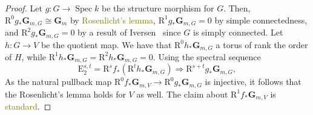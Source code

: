\documentclass[10pt,letterpaper,twoside]{article}
\newcommand{\BA}[1]{\textcolor{olive}{#1}}
\newcommand{\E}{\mathrm{E}}
\newcommand{\R}{\mathrm{R}}
\renewcommand{\1}{\mathbf{1}}
\newcommand{\bG}{\mathbf{G}}
\newcommand{\Gm}{\bG_{m}}
\DeclareMathOperator{\Spec}{Spec}
\newcommand{\iso}{\cong}
\theoremstyle{plain}
\theoremstyle{plain}
\theoremstyle{definition}
\theoremstyle{named}
\theoremstyle{definition}
\begin{document}
\begin{proof}
    Let $g\colon G\rightarrow\Spec k$ be the structure morphism for $G$.
    Then, $\R^0g_*\bG_{m,G}\iso\Gm$ by
    \BA{Rosenlicht's lemma}, $\R^1g_*\bG_{m,G}=0$ by simple connectedness, and $\R^2g_*\bG_{m,G}=0$
    by a result of Iversen~\cite{iversen} since $G$ is simply connected. Let $h\colon G\rightarrow
    V$ be the quotient map. We have that $\R^0h_*\bG_{m,G}$ a torus of rank the order of $H$, while
    $\R^1h_*\bG_{m,G}=\R^2h_*\bG_{m,G}=0$. 
    Using the spectral sequence $$\E_2^{s,t}=\R^s f_*(\R^t h_*\bG_{m,G})\Rightarrow\R^{s+t}
    g_*\bG_{m,G},$$
    As the natural pullback map $\R^0f_*\bG_{m,V}\rightarrow\R^0g_*\bG_{m,G}$ is
    injective, it follows that the Rosenlicht's lemma holds for $V$ as well. The claim about
    $\R^1f_*\bG_{m,V}$ is \BA{standard}.
\end{proof}





	
	

	
	
	


	
	\small
	
	
	
\end{document}
